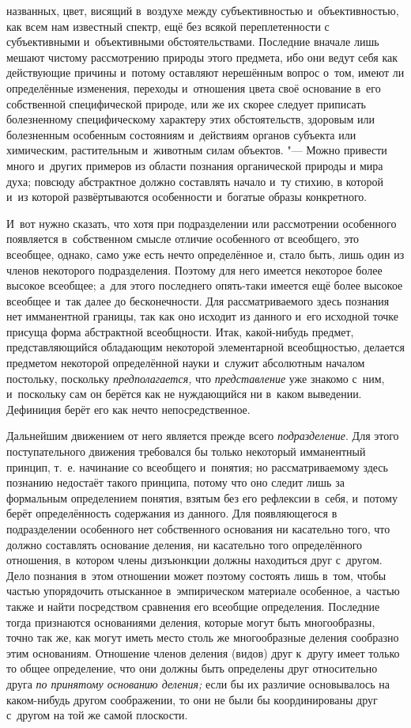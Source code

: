 названных, цвет, висящий в~воздухе между субъективностью и~объективностью,
как всем нам известный спектр, ещё без всякой переплетенности с
субъективными и~объективными обстоятельствами. Последние вначале лишь
мешают чистому рассмотрению природы этого предмета, ибо они ведут себя как
действующие причины и~потому оставляют нерешённым вопрос о~том, имеют ли
определённые изменения, переходы и~отношения цвета своё основание в~его
собственной специфической природе, или же их скорее следует приписать
болезненному специфическому характеру этих обстоятельств, здоровым или
болезненным особенным состояниям и~действиям органов субъекта или
химическим, растительным и~животным силам объектов. "--- Можно
привести много и~других примеров из области познания органической природы и
мира духа; повсюду абстрактное должно составлять начало и~ту стихию, в
которой и~из которой развёртываются особенности и~богатые образы
конкретного.

И~вот нужно сказать, что хотя при подразделении или
рассмотрении особенного появляется в~собственном смысле отличие особенного
от всеобщего, это всеобщее, однако, само уже есть нечто определённое и,
стало быть, лишь один из членов некоторого подразделения. Поэтому для него
имеется некоторое более высокое всеобщее; а~для этого последнего опять-таки
имеется ещё более высокое всеобщее и~так далее до
бесконечности. Для рассматриваемого здесь познания нет имманентной границы,
так как оно исходит из данного и~его исходной точке присуща форма
абстрактной всеобщности. Итак, какой-нибудь предмет, представляющийся
обладающим некоторой элементарной всеобщностью, делается предметом
некоторой определённой науки и~служит абсолютным началом постольку,
поскольку {\em предполагается,}
что {\em представление}
уже знакомо с~ним, и~поскольку сам он берётся как не
нуждающийся ни в~каком выведении. Дефиниция берёт его как нечто
непосредственное.

Дальнейшим движением от него является прежде всего
{\em подразделение}. Для
этого поступательного движения требовался бы только некоторый имманентный
принцип, т.~е. начинание со всеобщего и~понятия; но рассматриваемому здесь
познанию недостаёт такого принципа, потому что оно следит лишь за
формальным определением понятия, взятым без его рефлексии в~себя, и~потому
берёт определённость содержания из данного. Для появляющегося в
подразделении особенного нет собственного основания ни касательно того, что
должно составлять основание деления, ни касательно того определённого
отношения, в~котором члены дизъюнкции должны находиться друг с~другом. Дело
познания в~этом отношении может поэтому состоять лишь в~том, чтобы частью
упорядочить отысканное в~эмпирическом материале особенное, а~частью также и
найти посредством сравнения его всеобщие определения. Последние тогда
признаются основаниями деления, которые могут быть многообразны, точно так
же, как могут иметь место столь же многообразные деления сообразно этим
основаниям. Отношение членов деления (видов) друг к~другу имеет только то
общее определение, что они должны быть определены друг относительно друга
{\em по принятому основанию деления;} если бы их различие основывалось на
каком-нибудь другом соображении, то они не были бы координированы друг
с~другом на той же самой плоскости.

